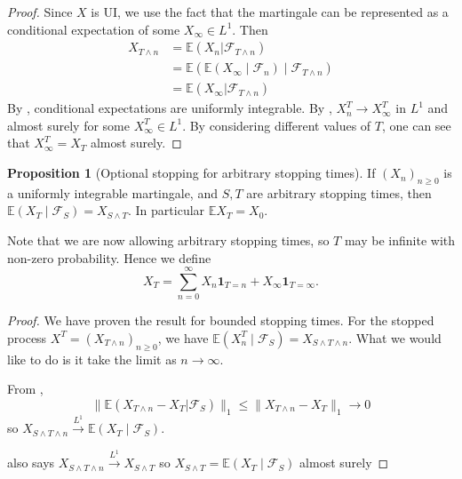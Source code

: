 \documentclass[parskip=full]{article}
\theoremstyle{definition}
\newtheorem{proposition}{Proposition}[section]
\newcommand{\1}{\mathbbm{1}}
\newcommand{\E}{\mathbb{E}}
\begin{document}
\begin{proof}
  Since $X$ is UI, we use the fact that the martingale can be represented as a conditional expectation of some $X_\infty \in L^1$. Then
  \begin{align*}
    X_{T \wedge n} &= \E(X_n | \mathcal{F}_{T \wedge n}) \\
                   &= \E (\E(X_\infty \mid \mathcal{F}_n) \mid \mathcal{F}_{T \wedge n}) \\
                   &= \E (X_\infty | \mathcal{F}_{T \wedge n})
  \end{align*}
  By , conditional expectations are uniformly integrable. By , $X^T_n \to X^T_\infty$ in $L^1$ and almost surely for some $X^T_\infty \in L^1$. By considering different values of $T$, one can see that $X^T_\infty = X_T$ almost surely.
\end{proof}

\begin{proposition}[Optional stopping for arbitrary stopping times]
  If $(X_n)_{n \geq 0}$ is a uniformly integrable martingale, and $S, T$ are arbitrary stopping times, then $\E(X_T \mid \mathcal{F}_S) = X_{S \wedge T}$. In particular $\E X_T = X_0$.
  
  Note that we are now allowing arbitrary stopping times, so $T$ may be infinite with non-zero probability. Hence we define
\[
  X_T = \sum_{n = 0}^\infty X_n \mathbf{1}_{T = n} + X_\infty \mathbf{1}_{T = \infty}.
\]
\end{proposition}

\begin{proof}
  We have proven the result for bounded stopping times. For the stopped process $X^T = (X_{T \wedge n})_{n \geq 0}$, we have $\E(X^T_n \mid \mathcal{F}_S) = X_{S \wedge T \wedge n}$. What we would like to do is it take the limit as $n \to \infty$.

From , 
  \[
    \|\E(X_{T \wedge n} - X_{T} | \mathcal{F}_S)\|_1 \leq \|X_{T \wedge n} - X_{T}\|_1 \to 0
  \]
  so $X_{S \wedge T \wedge n} \xrightarrow{L^1} \E(X_T \mid \mathcal{F}_S)$.

   also says $X_{S \wedge T \wedge n} \xrightarrow{L^1} X_{S \wedge T}$ so $X_{S \wedge T} = \E(X_T \mid \mathcal{F}_S)$ almost surely
\end{proof}
\end{document}
